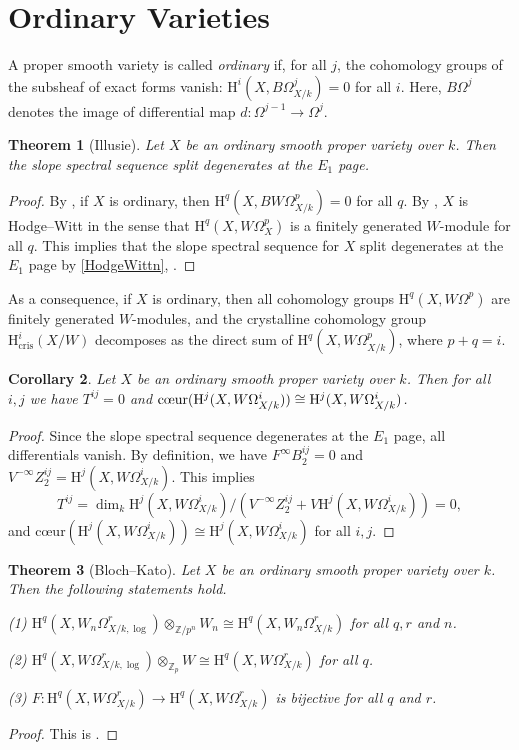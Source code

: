 \documentclass[a4paper,12pt,twoside]{report}
\newtheorem{theorem}{Theorem}[section]
\newtheorem{corollary}[theorem]{Corollary}
\newcommand{\Z}{\mathbb{Z}}
\newcommand{\cris}{\mathrm{cris}}
\newcommand{\HH}{\mathrm{H}}
\begin{document}
\section{Ordinary Varieties}

A proper smooth variety is called {\em ordinary} if, for all $j$, the cohomology groups
of the subsheaf of exact forms vanish: $\HH^i(X,B\Omega^j_{X/k})=0$ for all $i$. 
Here, $B\Omega^j$ denotes the image of differential map $d:\Omega^{j-1}\rightarrow \Omega^j$. 

\begin{theorem}[Illusie]\label{Illusie}
Let $X$ be an ordinary smooth proper variety over $k$. Then
the slope spectral sequence split degenerates at the $E_1$ page. 
\end{theorem}
\begin{proof} By \cite[Theorem IV.4.13]{IR}, 
if $X$ is ordinary, then $\HH^q(X,BW\Omega^p_{X/k})=0$ for all $q$.
By \cite[Theorem 3.4.1]{I2}, $X$ is Hodge--Witt in the sense that $\HH^q(X,W\Omega_X^p)$ 
is a finitely generated $W$-module for all $q$. 
This implies that the slope spectral sequence for $X$ split degenerates at the $E_1$ page
by \ref{HodgeWittn}, \cite[Theorem II.3.7]{Il1}. 
\end{proof} 

As a consequence, if $X$ is ordinary, then all cohomology groups $\HH^q(X,W\Omega^p)$ are finitely generated $W$-modules, 
and the crystalline cohomology group $\HH^i_{\cris}(X/W)$ decomposes as the direct sum of $\HH^q(X,W\Omega_{X/k}^p)$, where $p+q=i$. 

\begin{corollary}\label{ordcor}
    Let $X$ be an ordinary smooth proper variety over $k$. Then for all $i,j$
we have $T^{ij}=0$
    and $\text{\rm c\oe ur}(\HH^j(X,W\Omega^i_{X/k})) \cong \HH^j(X,W\Omega^i_{X/k})$. 
\end{corollary}
\begin{proof}
Since the slope spectral sequence degenerates at the $E_1$ page, 
all differentials vanish. 
By definition, we have $F^{\infty}B_2^{ij}=0$ and  $V^{-\infty}Z_2^{ij}=\HH^j(X,W\Omega^i_{X/k})$. 
This implies \[T^{ij}=\dim_k \HH^j(X,W\Omega^i_{X/k})/(V^{-\infty}Z_2^{ij}+V\HH^j(X,W\Omega^i_{X/k}))=0,\]
and $\text{c\oe ur}(\HH^j(X,W\Omega^i_{X/k})) \cong \HH^j(X,W\Omega^i_{X/k})$ for all $i,j$.
\end{proof} 

\begin{theorem}[Bloch--Kato]\label{Bloch-Kato}
Let $X$ be an ordinary smooth proper variety over $k$.
Then the following statements hold.
    
{\rm (1)} $\HH^q(X,W_n\Omega_{X/k,\log}^r) \otimes_{\Z/p^n} W_n \cong \HH^q(X,W_n\Omega_{X/k}^r)$ for all $q,r$ and $n$. 

{\rm (2)} $\HH^q(X,W\Omega_{X/k,\log}^r) \otimes_{\Z_p} W \cong \HH^q(X,W\Omega_{X/k}^r)$ for all $q$. 

{\rm (3)} $F:\HH^q(X,W\Omega_{X/k}^r)\rightarrow \HH^q(X,W\Omega_{X/k}^r)$ is bijective for all $q$ and $r$.
\end{theorem}
\begin{proof}
    This is \cite[Proposition 7.3]{BK}.
\end{proof}  
\end{document}
